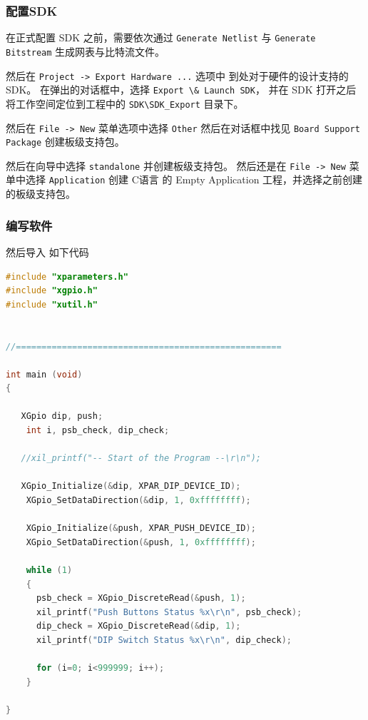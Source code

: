 \documentclass{ctexart}
\begin{document}
        \subsubsection{配置SDK}
        
        在正式配置 SDK 之前，需要依次通过 
        \verb|Generate Netlist| 与 \verb|Generate Bitstream|
        生成网表与比特流文件。
        
        然后在 \verb|Project -> Export Hardware ...| 选项中
        到处对于硬件的设计支持的 SDK。
        在弹出的对话框中，选择 \verb|Export \& Launch SDK|，
        并在 SDK 打开之后将工作空间定位到工程中的
        \verb|SDK\SDK_Export| 目录下。
        
        然后在 \verb|File -> New| 菜单选项中选择 \verb|Other|
        然后在对话框中找见 \verb|Board Support Package|
        创建板级支持包。

        然后在向导中选择 \verb|standalone| 并创建板级支持包。
        然后还是在 \verb|File -> New| 菜单中选择 \verb|Application|
        创建 C语言 的 Empty Application 工程，并选择之前创建的板级支持包。

        \subsubsection{编写软件}

        然后导入 如下代码
\begin{lstlisting}[language=C]
#include "xparameters.h"
#include "xgpio.h"
#include "xutil.h"
  

//====================================================

int main (void) 
{

   XGpio dip, push;
	int i, psb_check, dip_check;
	
   //xil_printf("-- Start of the Program --\r\n");
 
   XGpio_Initialize(&dip, XPAR_DIP_DEVICE_ID);
	XGpio_SetDataDirection(&dip, 1, 0xffffffff);
	
	XGpio_Initialize(&push, XPAR_PUSH_DEVICE_ID);
	XGpio_SetDataDirection(&push, 1, 0xffffffff);
	
	while (1)
	{
	  psb_check = XGpio_DiscreteRead(&push, 1);
	  xil_printf("Push Buttons Status %x\r\n", psb_check);
	  dip_check = XGpio_DiscreteRead(&dip, 1);
	  xil_printf("DIP Switch Status %x\r\n", dip_check);
	  
	  for (i=0; i<999999; i++); 
	}
 
}
\end{lstlisting}
        
\end{document}
